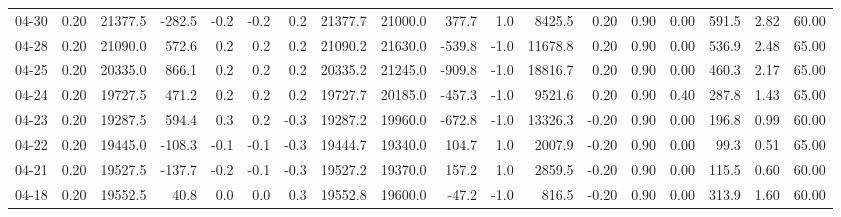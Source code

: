 \begin{threeparttable}
{\begin{tabular}{lrrrrrrrrrrrrrrrrr}
  04-30 &     0.20 & 21377.5 &            -282.5 &              -0.2 &               -0.2 &                0.2 & 21377.7 & 21000.0 &      377.7 &                      1.0 &              8425.5 &       0.20 &      0.90 &           0.00 &            591.5 &            2.82 &                  60.00 \\
  04-28 &     0.20 & 21090.0 &             572.6 &               0.2 &                0.2 &                0.2 & 21090.2 & 21630.0 &     -539.8 &                     -1.0 &             11678.8 &       0.20 &      0.90 &           0.00 &            536.9 &            2.48 &                  65.00 \\
  04-25 &     0.20 & 20335.0 &             866.1 &               0.2 &                0.2 &                0.2 & 20335.2 & 21245.0 &     -909.8 &                     -1.0 &             18816.7 &       0.20 &      0.90 &           0.00 &            460.3 &            2.17 &                  65.00 \\
  04-24 &     0.20 & 19727.5 &             471.2 &               0.2 &                0.2 &                0.2 & 19727.7 & 20185.0 &     -457.3 &                     -1.0 &              9521.6 &       0.20 &      0.90 &           0.40 &            287.8 &            1.43 &                  65.00 \\
  04-23 &     0.20 & 19287.5 &             594.4 &               0.3 &                0.2 &               -0.3 & 19287.2 & 19960.0 &     -672.8 &                     -1.0 &             13326.3 &      -0.20 &      0.90 &           0.00 &            196.8 &            0.99 &                  60.00 \\
  04-22 &     0.20 & 19445.0 &            -108.3 &              -0.1 &               -0.1 &               -0.3 & 19444.7 & 19340.0 &      104.7 &                      1.0 &              2007.9 &      -0.20 &      0.90 &           0.00 &             99.3 &            0.51 &                  65.00 \\
  04-21 &     0.20 & 19527.5 &            -137.7 &              -0.2 &               -0.1 &               -0.3 & 19527.2 & 19370.0 &      157.2 &                      1.0 &              2859.5 &      -0.20 &      0.90 &           0.00 &            115.5 &            0.60 &                  60.00 \\
  04-18 &     0.20 & 19552.5 &              40.8 &               0.0 &                0.0 &                0.3 & 19552.8 & 19600.0 &      -47.2 &                     -1.0 &               816.5 &      -0.20 &      0.90 &           0.00 &            313.9 &            1.60 &                  60.00 \\

\end{tabular}}
\end{threeparttable}
